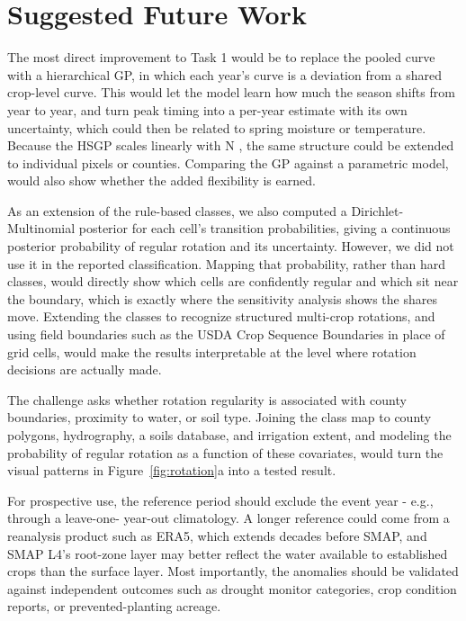\documentclass[10pt,letterpaper]{article}
\begin{document}
\section{Suggested Future Work}\label{sec:future}

The most direct improvement to Task 1 would be to replace the pooled curve with a hierarchical GP, in which each year's curve is a deviation from a shared crop-level curve. This would let the model learn how much the season shifts from year to year, and turn peak timing into a per-year estimate with its own uncertainty, which could then be related to spring moisture or temperature. Because the HSGP scales linearly with N , the same structure could be extended to individual pixels or counties. Comparing the GP against a parametric model, would also show whether the added flexibility is earned.

As an extension of the rule-based classes, we also computed a Dirichlet-Multinomial posterior for each cell's transition probabilities, giving a continuous posterior probability of regular rotation and its uncertainty. However, we did not use it in the reported classification. Mapping that probability, rather than hard classes, would directly show which cells are confidently regular and which sit near the boundary, which is exactly where the sensitivity analysis shows the shares move. Extending the classes to recognize structured multi-crop rotations, and using field boundaries such as the USDA Crop Sequence Boundaries in place of grid cells, would make the results interpretable at the level where rotation decisions are actually made.

The challenge asks whether rotation regularity is associated with county boundaries, proximity to water, or soil type. Joining the class map to county polygons, hydrography, a soils database, and irrigation extent, and modeling the probability of regular rotation as a function of these covariates, would turn the visual patterns in Figure~\ref{fig:rotation}a into a tested result.

For prospective use, the reference period should exclude the event year - e.g., through a leave-one- year-out climatology. A longer reference could come from a reanalysis product such as ERA5, which extends decades before SMAP, and SMAP L4's root-zone layer may better reflect the water available to established crops than the surface layer. Most importantly, the anomalies should be validated against independent outcomes such as drought monitor categories, crop condition reports, or prevented-planting acreage.
\end{document}
